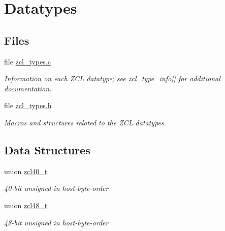 \hypertarget{group__zcl__types}{\section{Datatypes}
\label{group__zcl__types}
}
\subsection*{Files}
\begin{DoxyCompactItemize}
\item 
file \hyperlink{zcl__types_8c}{zcl\-\_\-types.\-c}
\begin{DoxyCompactList}\small\item\em Information on each Z\-C\-L datatype; see zcl\-\_\-type\-\_\-info\mbox{[}\mbox{]} for additional documentation. \end{DoxyCompactList}\item 
file \hyperlink{zcl__types_8h}{zcl\-\_\-types.\-h}
\begin{DoxyCompactList}\small\item\em Macros and structures related to the Z\-C\-L datatypes. \end{DoxyCompactList}\end{DoxyCompactItemize}
\subsection*{Data Structures}
\begin{DoxyCompactItemize}
\item 
union \hyperlink{unionzcl40__t}{zcl40\-\_\-t}
\begin{DoxyCompactList}\small\item\em 40-\/bit unsigned in host-\/byte-\/order \end{DoxyCompactList}\item 
union \hyperlink{unionzcl48__t}{zcl48\-\_\-t}
\begin{DoxyCompactList}\small\item\em 48-\/bit unsigned in host-\/byte-\/order \end{DoxyCompactList}\end{DoxyCompactItemize}

